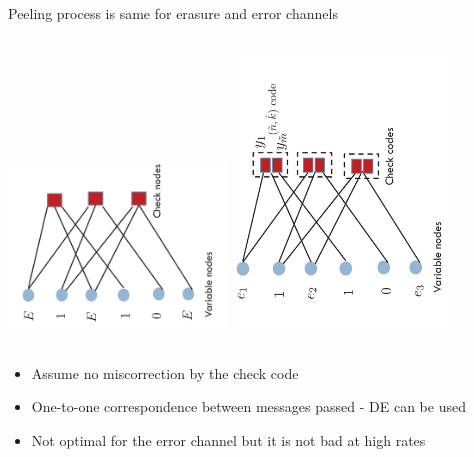 \documentclass[10pt,xcolor=table]{beamer}
\begin{document}
\begin{frame}{Peeling process is same for erasure and error channels}
\begin{columns}
\includegraphics[width=2.3in,angle=-90]{./Figures/Tannergraph63codewitherasures}
\includegraphics[width=2.25in,angle=-90]{./Figures/GLDPC}
\end{columns}
\begin{block}{}
\begin{itemize}
  \item Assume no miscorrection by the check code
  \item One-to-one correspondence between messages passed - DE can be used
  \item Not optimal for the error channel but it is not bad at high rates
\end{itemize}
\end{block}
\end{frame}
\end{document}

